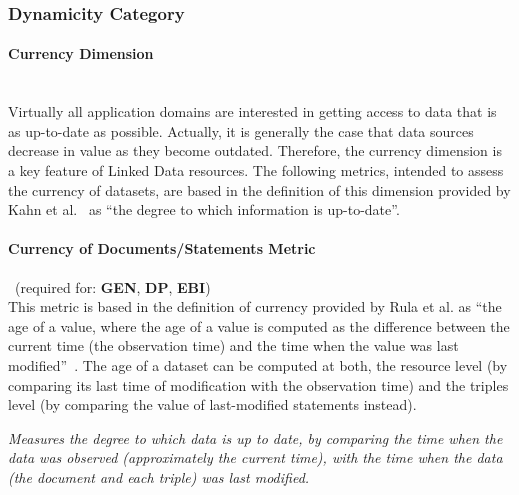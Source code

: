 \subsubsection{Dynamicity Category}
\label{sec:Dynamicity} 

\paragraph{Currency Dimension}~\\ %
Virtually all application domains are interested in getting access to data that is as up-to-date as possible. Actually, it is generally the case that data sources decrease in value as they become outdated. Therefore, the currency dimension is a key feature of Linked Data resources. The following metrics, intended to assess the currency of datasets, are based in the definition of this dimension provided by Kahn et al.~\cite{Kahn2002} as ``the degree to which information is up-to-date''.

\paragraph{Currency of Documents/Statements Metric}~(required for: \textbf{GEN}, \textbf{DP}, \textbf{EBI})~\\ %
This metric is based in the definition of currency provided by Rula et al. as ``the age of a value, where the age of a value is computed as the difference between the current time (the observation time) and the time when the value was last modified''~\cite{Rula2012}. The age of a dataset can be computed at both, the resource level (by comparing its last time of modification with the observation time) and the triples level (by comparing the value of last-modified statements instead).
\begin{mdframed}[style=metricdefinition]
\emph{Measures the degree to which data is up to date, by comparing the time when the data was observed (approximately the current time), with the time when the data (the document and each triple) was last modified.}
\end{mdframed}

